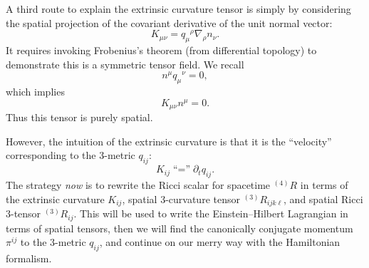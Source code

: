 A third route to explain the extrinsic curvature tensor is simply by
considering the spatial projection of the covariant derivative of the unit
normal vector:
\begin{equation}
K_{\mu\nu} = {q_{\mu}}^{\rho}\nabla_{\rho}n_{\nu}.
\end{equation}
It requires invoking Frobenius's theorem (from differential topology) to
demonstrate this is a symmetric tensor field. We recall
\begin{equation}
n^{\mu}{q_{\mu}}^{\nu} = 0,
\end{equation}
which implies
\begin{equation}
K_{\mu\nu}n^{\mu} = 0.
\end{equation}
Thus this tensor is purely spatial.

However, the intuition of the extrinsic curvature is that it is the
``velocity'' corresponding to the 3-metric $q_{ij}$:
\begin{equation}
\boxed{K_{ij}\mathrel{\mbox{``=''}}\partial_{t}q_{ij}.}
\end{equation}
The strategy
\emph{now} is to rewrite the Ricci scalar for spacetime ${}^{(4)}R$ in
terms of the extrinsic curvature $K_{ij}$, spatial 3-curvature tensor
${}^{(3)}R_{ijk\ell}$, and spatial Ricci 3-tensor ${}^{(3)}R_{ij}$. This
will be used to write the Einstein--Hilbert Lagrangian in terms of
spatial tensors, then we will find the canonically conjugate momentum
$\pi^{ij}$ to the 3-metric $q_{ij}$, and continue on our merry way with
the Hamiltonian formalism.